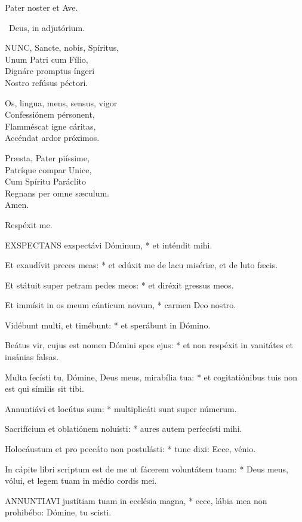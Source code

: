 Pater noster et Ave.

\V\ Deus, in adjutórium.


\lettrine[lines=2]{N}{UNC}, Sancte, nobis, Spíritus,\\
Unum Patri cum Fílio,\\
Dignáre promptus íngeri\\
Nostro refúsus péctori.

Os, lingua, mens, sensus, vigor\\
Confessiónem pérsonent,\\
Flamméscat igne cáritas,\\
Accéndat ardor próximos.

Præsta, Pater piíssime,\\
Patríque compar Unice,\\
Cum Spíritu Paráclito\\
Regnans per omne sæculum.\\
Amen.

 Respéxit me.


\lettrine[lines=2]{E}{XSPECTANS} exspectávi Dóminum, * et inténdit mihi.

Et exaudívit preces meas: * et edúxit me de lacu misériæ, et de luto fæcis.

Et státuit super petram pedes meos: * et diréxit gressus meos.

Et immísit in os meum cánticum novum, * carmen Deo nostro.

Vidébunt multi, et timébunt: * et sperábunt in Dómino.

Beátus vir, cujus est nomen Dómini spes ejus: * et non respéxit in vanitátes et insánias falsas.

Multa fecísti tu, Dómine, Deus meus, mirabília tua: * et cogitatiónibus tuis non est qui símilis sit tibi.

Annuntiávi et locútus sum: * multiplicáti sunt super númerum.

Sacrifícium et oblatiónem noluísti: * aures autem perfecísti mihi.

Holocáustum et pro peccáto non postulásti: * tunc dixi: Ecce, vénio.

In cápite libri scriptum est de me ut fácerem voluntátem tuam: * Deus meus, vólui, et legem tuam in médio cordis mei.


\lettrine[lines=2]{A}{NNUNTIAVI} justítiam tuam in ecclésia magna, * ecce, lábia mea non prohibébo: Dómine, tu scisti.

